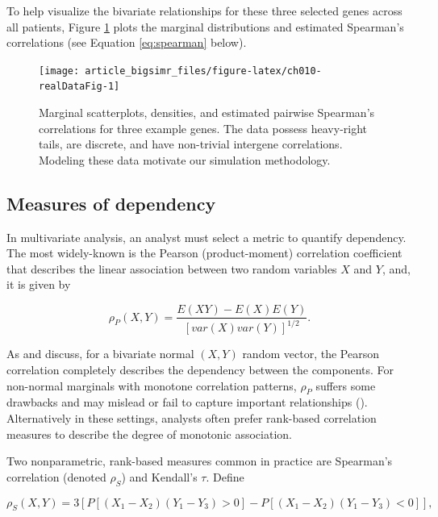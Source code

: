 \documentclass[]{article}
\begin{document}
To help visualize the bivariate relationships for these three selected genes across all patients, Figure \ref{fig:ch010-realDataFig} plots the marginal distributions and estimated Spearman's correlations (see Equation \eqref{eq:spearman} below).

\begin{figure}

{\centering \texttt{[image: article\_bigsimr\_files/figure-latex/ch010-realDataFig-1]} 

}

\caption{Marginal scatterplots, densities, and estimated pairwise Spearman's correlations for three example genes. The data possess heavy-right tails, are discrete, and have non-trivial intergene correlations. Modeling these data motivate our simulation methodology.}\label{fig:ch010-realDataFig}
\end{figure}

\hypertarget{measures-of-dependency}{%
\subsection{Measures of dependency}\label{measures-of-dependency}}

In multivariate analysis, an analyst must select a metric to quantify dependency.
The most widely-known is the Pearson (product-moment) correlation coefficient that describes the linear association between two random variables \(X\) and \(Y\), and, it is given by

\begin{equation}
\label{eq:pearson}
\rho_P(X,Y) = \frac{E(XY) - E(X)E(Y)}{\left[ var(X)var(Y)\right]^{1/2}}.
\end{equation}

As \citet{MB13} and \citet{MK01} discuss, for a bivariate normal \((X,Y)\) random vector, the Pearson correlation completely describes the dependency between the components.
For non-normal marginals with monotone correlation patterns, \(\rho_P\) suffers some drawbacks and may mislead or fail to capture important relationships (\citet{MK01}).
Alternatively in these settings, analysts often prefer rank-based correlation measures to describe the degree of monotonic association.

Two nonparametric, rank-based measures common in practice are Spearman's correlation (denoted \(\rho_S\)) and Kendall's \(\tau\).
Define

\begin{equation}
\label{eq:spearman}
\rho_S(X,Y) = 3 \left[ P\left[ (X_1 - X_2)(Y_1-Y_3) > 0 \right] - P\left[ (X_1 - X_2)(Y_1-Y_3) < 0 \right] \right],
\end{equation}
\end{document}
